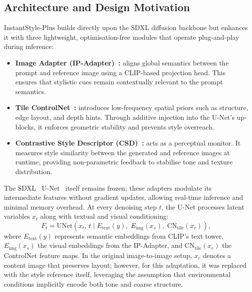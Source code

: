 \subsection{Architecture and Design Motivation}
\label{sec:isp_arch}

InstantStyle-Plus builds directly upon the SDXL diffusion backbone but enhances it with three lightweight, optimisation-free modules that operate plug-and-play during inference:

\begin{itemize}
    \item \textbf{Image Adapter (IP-Adapter)~\cite{ye2023ipadapterfidelityadapters}:} aligns global semantics between the prompt and reference image using a CLIP-based projection head. This ensures that stylistic cues remain contextually relevant to the prompt semantics.
    \item \textbf{Tile ControlNet~\cite{zhang2023controlnet}:} introduces low-frequency spatial priors such as structure, edge layout, and depth hints. Through additive injection into the U-Net's up-blocks, it enforces geometric stability and prevents style overreach.
    \item \textbf{Contrastive Style Descriptor (CSD)~\cite{somepalli2024csd}:} acts as a perceptual monitor. It measures style similarity between the generated and reference images at runtime, providing non-parametric feedback to stabilise tone and texture distribution.
\end{itemize}

\noindent The SDXL~\cite{podell2023sdxlimprovinglatentdiffusion} U-Net~\cite{ronneberger2015unet} itself remains frozen; these adapters modulate its intermediate features without gradient updates, allowing real-time inference and minimal memory overhead.
At every denoising step $t$, the U-Net processes latent variables $x_t$ along with textual and visual conditioning:
\begin{equation}
    F_t = \mathrm{UNet}\!\left(x_t,\,t \;\Big|\; E_\mathrm{text}(y),\; E_\mathrm{img}(x_s),\; \mathrm{CN}_\mathrm{tile}(x_c)\right),
    \label{eq:isp_conditioning}
\end{equation}
where $E_\mathrm{text}(y)$ represents semantic embeddings from CLIP's text tower, $E_\mathrm{img}(x_s)$ the visual embeddings from the IP-Adapter, and $\mathrm{CN}_\mathrm{tile}(x_c)$ the ControlNet feature maps.
In the original image-to-image setup, $x_c$ denotes a content image that preserves layout; however, for this adaptation, it was replaced with the style reference itself, leveraging the assumption that environmental conditions implicitly encode both tone and coarse structure.

